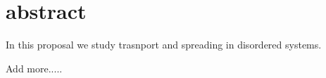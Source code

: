 \chapter*{abstract}


In this proposal we study trasnport and spreading in disordered systems.




Add more.....



